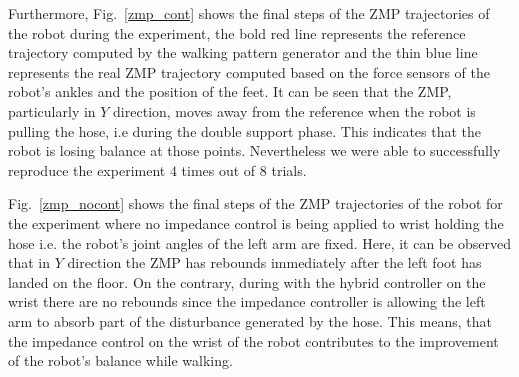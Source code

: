 Furthermore, Fig.~\ref{zmp_cont} shows the final steps of the ZMP trajectories of the robot during the experiment, the bold red line represents the reference trajectory computed by the walking pattern generator and the thin blue line represents the real ZMP trajectory computed based on the force sensors of the robot's ankles and the position of the feet.
%
It can be seen that the ZMP, particularly in $Y$ direction, moves away from the reference when the robot is pulling the hose, i.e during the double support phase.
%
This indicates that the robot is losing balance at those points.
%
Nevertheless we were able to successfully reproduce the experiment $4$ times out of $8$ trials. 
%



Fig.~\ref{zmp_nocont} shows the final steps of the ZMP trajectories of the robot for the experiment where no impedance control is being applied to wrist holding the hose i.e. the robot's joint angles of the left arm are fixed.
%
Here, it can be observed that in $Y$ direction the ZMP has rebounds immediately after the left foot has landed on the floor.
%
On the contrary, during with the hybrid controller on the wrist there are no rebounds since the impedance controller is allowing the left arm to absorb part of the disturbance generated by the hose.
%
This means, that the impedance control on the wrist of the robot contributes to the improvement of the robot's balance while walking.
%
